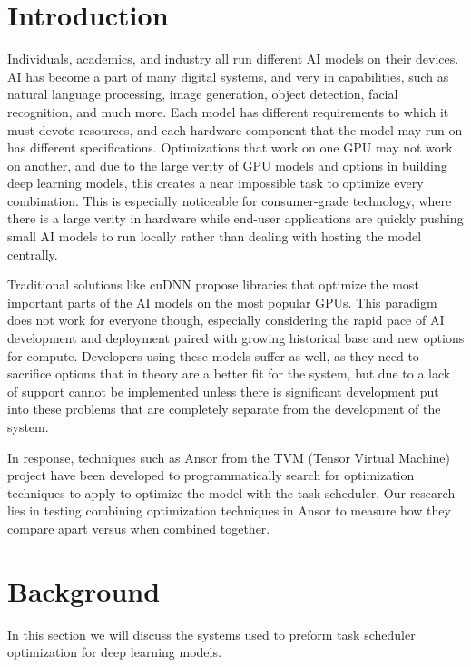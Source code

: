 \documentclass[conference]{IEEEtran}
\begin{document}
\section{Introduction}
Individuals, academics, and industry all run different AI models on their devices.
AI has become a part of many digital systems, and very in capabilities, such as natural language processing, image generation, object detection, facial recognition, and much more. Each model has different requirements to which it must devote resources, and each hardware component that the model may run on has different specifications. Optimizations that work on one GPU may not work on another, and due to the large verity of GPU models and options in building deep learning models, this creates a near impossible task to optimize every combination. This is especially noticeable for consumer-grade technology, where there is a large verity in hardware while end-user applications are quickly pushing small AI models to run locally rather than dealing with hosting the model centrally.

Traditional solutions like cuDNN \cite{chetlur_cudnn_2014} propose libraries that optimize the most important parts of the AI models on the most popular GPUs. This paradigm does not work for everyone though, especially considering the rapid pace of AI development and deployment paired with growing historical base and new options for compute. Developers using these models suffer as well, as they need to sacrifice options that in theory are a better fit for the system, but due to a lack of support cannot be implemented unless there is significant development put into these problems that are completely separate from the development of the system.

In response, techniques such as Ansor \cite{zheng_ansor_2023} from the TVM (Tensor Virtual Machine) \cite{chen_tvm_2018} project have been developed to programmatically search for optimization techniques to apply to optimize the model with the task scheduler. Our research lies in testing combining optimization techniques in Ansor to measure how they compare apart versus when combined together. 

\section{Background}
In this section we will discuss the systems used to preform task scheduler optimization for deep learning models.
\end{document}
